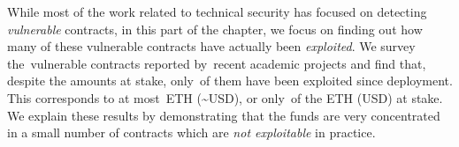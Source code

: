 While most of the work related to technical security has focused on detecting \emph{vulnerable} contracts, in this part of the chapter, we focus on finding out how many of these vulnerable contracts have actually been \emph{exploited}.
We survey the~\VulnerableContracts vulnerable contracts reported by~\PapersAnalyzed recent academic projects and find that, despite the amounts at stake, only~\PercentExploitedContracts of them have been exploited since deployment.
This corresponds to at most~\ExploitedEther ETH (\textasciitilde\ExploitedEtherUSD USD\footnotemark), or only~\PercentExploitedEther of the \EtherClaimedVulnerable ETH (\EtherClaimedVulnerableUSD USD) at stake.
We explain these results by demonstrating that the funds are very concentrated in a small number of contracts which are \emph{not exploitable} in practice.

